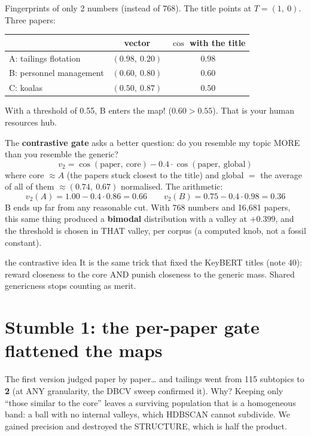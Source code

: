 \documentclass[11pt,a4paper]{article}
\begin{document}
Fingerprints of only 2 numbers (instead of 768). The title points at $T=(1,\ 0)$. Three papers:

\begin{center}
\begin{tabular}{lcc}
 & vector & $\cos$ with the title \\
\hline
A: tailings flotation   & $(0.98,\ 0.20)$ & $0.98$ \\
B: personnel management & $(0.60,\ 0.80)$ & $0.60$ \\
C: koalas               & $(0.50,\ 0.87)$ & $0.50$ \\
\end{tabular}
\end{center}

With a threshold of 0.55, B enters the map! ($0.60 > 0.55$). That is your human resources hub.

The \textbf{contrastive gate} asks a better question: do you resemble my topic MORE than you
resemble the generic?
\[
v_2 = \cos(\mbox{paper},\ \mbox{core}) - 0.4 \cdot \cos(\mbox{paper},\ \mbox{global})
\]
where core $\approx A$ (the papers stuck closest to the title) and global $=$ the average of
all of them $\approx (0.74,\ 0.67)$ normalised. The arithmetic:
\[
v_2(A) = 1.00 - 0.4 \cdot 0.86 = \mathbf{0.66}
\qquad
v_2(B) = 0.75 - 0.4 \cdot 0.98 = \mathbf{0.36}
\]
B ends up far from any reasonable cut. With 768 numbers and 16,681 papers, this same thing
produced a \textbf{bimodal} distribution with a valley at $+0.399$, and the threshold is chosen
in THAT valley, per corpus (a computed knob, not a fossil constant).

\begin{concepto}{the contrastive idea}
It is the same trick that fixed the KeyBERT titles (note 40): reward closeness to the core AND
punish closeness to the generic mass. Shared genericness stops counting as merit.
\end{concepto}

\section{Stumble 1: the per-paper gate flattened the maps}

The first version judged paper by paper\ldots{} and tailings went from 115 subtopics to
\textbf{2} (at ANY granularity, the DBCV sweep confirmed it). Why? Keeping only ``those similar
to the core'' leaves a surviving population that is a homogeneous band: a ball with no internal
valleys, which HDBSCAN cannot subdivide. We gained precision and destroyed the STRUCTURE, which
is half the product.
\end{document}
